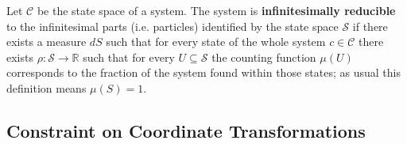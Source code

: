 \documentclass{article}
\begin{document}
\begin{defn}
	Let $\mathcal{C}$ be the state space of a system. The system is \textbf{infinitesimally reducible} to the infinitesimal parts (i.e. particles) identified by the state space $\mathcal{S}$ if there exists a measure $dS$ such that for every state of the whole system $c \in \mathcal{C}$ there exists $\rho : \mathcal{S} \to \mathbb{R}$ such that for every $U \subseteq \mathcal{S}$ the counting function $\mu(U)$ corresponds to the fraction of the system found within those states; as usual this definition means $\mu(S) = 1$.
\end{defn}	
	
\subsection{Constraint on Coordinate Transformations}	

	
\end{document}
